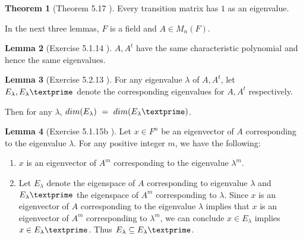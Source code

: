 \documentclass{amsart}
\theoremstyle{definition}
\newtheorem{theorem}{Theorem}
\newtheorem{lemma}[theorem]{Lemma}
\theoremstyle{remark}
\numberwithin{equation}{section}
\begin{document}
\begin{theorem}[Theorem 5.17 \cite{friedberg2003linear}]\label{theorem517}
Every transition matrix has $1$ as an eigenvalue.

\end{theorem}

In the next three lemmas, $F$ is a field and $A \in M_n(F)$.

\begin{lemma}[Exercise 5.1.14 \cite{friedberg2003linear}]\label{exercise5114}
$A, A^t$ have the same characteristic polynomial and hence the same
eigenvalues.
\end{lemma}

\begin{lemma}[Exercise 5.2.13 \cite{friedberg2003linear}]\label{exercise5213}
For any eigenvalue $\lambda$ of $A, A^t$, let $E_{\lambda},
E_{\lambda}\textprime$ denote the corresponding eigenvalues for $A,
A^t$ respectively.


Then for any $\lambda$, $dim(E_{\lambda})\ =\  dim(E_{\lambda}\textprime)$.

\end{lemma}

\begin{lemma}[Exercise 5.1.15b \cite{friedberg2003linear}]\label{exercise5115}
Let $x \in F^n$ be an eigenvector of $A$ corresponding to the
eigenvalue $\lambda$. For any positive integer $m$, we have the
following:

\begin{enumerate}
    \item
        $x$ is an eigenvector of $A^m$ corresponding to the eigenvalue
        $\lambda^m$.

    \item
        Let $E_{\lambda}$ denote the eigenspace of $A$ corresponding to eigenvalue $\lambda$ and $E_{\lambda}\textprime$ the
        eigenspace of $A^m$ corresponding to $\lambda$.
        Since $x$ is an eigenvector of $A$ corresponding to the eigenvalue $\lambda$ implies that $x$ is an eigenvector of $A^m$ corresponding to
        $\lambda^m$, we can conclude $x \in E_{\lambda}$ implies $x \in E_{\lambda}\textprime$.
        Thus $E_{\lambda} \subseteq E_{\lambda}\textprime$.

\end{enumerate}

\end{lemma}
\end{document}

